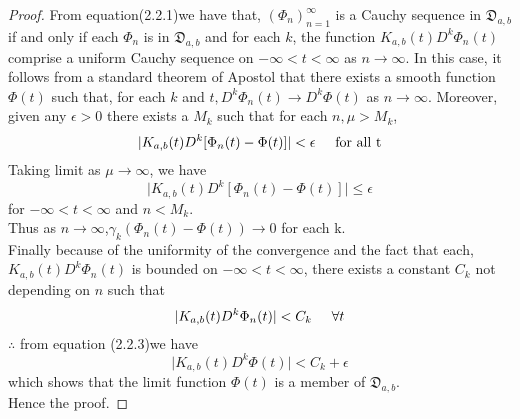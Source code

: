 \begin{proof}
 From equation(2.2.1)we have that, $(\Phi_{n})_{n=1}^{\infty}$ is a Cauchy sequence in $\mathfrak{D}_{a,b}$ if and only if each $\Phi_{n}$ is in $\mathfrak{D}_{a,b}$ and for each $k$, the function $K_{a,b}(t)D^{k}\Phi_{n}(t)$ comprise a uniform Cauchy sequence on
$-\infty < t < \infty $ as $n \rightarrow \infty $. In this case, it follows from a standard theorem of Apostol\cite{R2} that there exists a smooth function $\Phi(t)$ such that, for each $k$ and $t, D^{k}\Phi_{n}(t)\rightarrow D^{k}\Phi(t) $ as $n \rightarrow \infty $. Moreover, given any $\epsilon >0$ there exists a $ M_{k}$ such that for each $n, \mu > M_{k}$,
\begin{equation}
\vert K_{a,b}(t)D^{k}[\Phi_{n}(t)-\Phi(t)]\vert <\epsilon \hspace{0.5cm} \text{for all t}
\end{equation}
Taking limit as $ \mu\rightarrow\infty $, we have
\begin{equation}
\vert K_{a,b}(t)D^{k}[\Phi_{n}(t)-\Phi(t)]\vert \leq\epsilon
\end{equation}
for $-\infty < t < \infty$ and $ n < M_{k}$.\\
Thus as $n \rightarrow \infty $,$ \gamma_{k}(\Phi_{n}(t)-\Phi(t))\rightarrow 0 $ for each k.\\
Finally because of the uniformity of the convergence and the fact that each, $ K_{a,b}(t)D^{k}\Phi_{n}(t) $ is bounded on $-\infty < t < \infty$, there exists a constant $C_{k}$ not depending on $n$ such that 
\begin{equation}
\vert K_{a,b}(t)D^{k}\Phi_{n}(t)\vert <C_{k} \hspace{0.5cm} \forall t
\end{equation}
$\therefore$ from equation (2.2.3)we have
\begin{equation}
\vert K_{a,b}(t)D^{k}\Phi(t)\vert <C_{k} + \epsilon 
\end{equation}
which shows that the limit function $ \Phi(t) $ is a member of $\mathfrak{D}_{a,b}$.\\
Hence the proof.
\end{proof}
